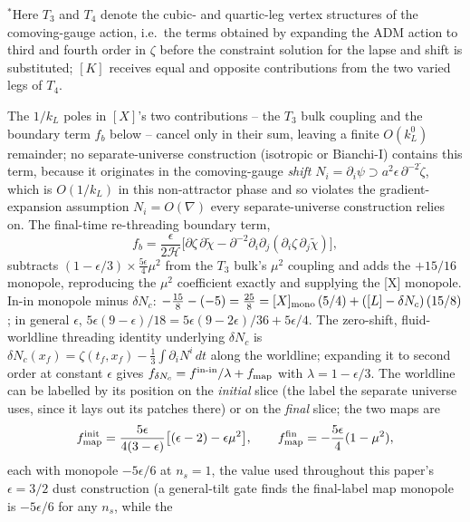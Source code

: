 \documentclass[aps,prd,twocolumn,superscriptaddress,nofootinbib,longbibliography]{revtex4-2}
\begin{document}
\noindent$^{\ast}$Here $T_3$ and $T_4$ denote the cubic- and quartic-leg
vertex structures of the comoving-gauge action, i.e.\ the terms obtained by
expanding the ADM action to third and fourth order in $\zeta$ before the
constraint solution for the lapse and shift is substituted; $[K]$ receives
equal and opposite contributions from the two varied legs of $T_4$.

The $1/k_L$ poles in $[X]$'s two contributions -- the $T_3$ bulk coupling
and the boundary term $f_b$ below -- cancel only in their sum, leaving a
finite $O(k_L^0)$ remainder; no separate-universe construction (isotropic or
Bianchi-I) contains this term, because it originates in the comoving-gauge
\emph{shift} $N_i=\partial_i\psi\supset a^2\epsilon\,\partial^{-2}\dot\zeta$,
which is $O(1/k_L)$ in this non-attractor phase and so violates the
gradient-expansion assumption $N_i=O(\nabla)$ every separate-universe
construction relies on. The final-time re-threading boundary term,
\begin{equation}
f_b=\frac{\epsilon}{2\mathcal H}\Big[\partial\zeta\,\partial\tilde\chi
-\partial^{-2}\partial_i\partial_j(\partial_i\zeta\,\partial_j\tilde\chi)\Big],
\end{equation}
subtracts $(1-\epsilon/3)\times\tfrac{5\epsilon}{4}\mu^2$ from the $T_3$
bulk's $\mu^2$ coupling and adds the $+15/16$ monopole, reproducing the
$\mu^2$ coefficient exactly and supplying the [X] monopole. In-in monopole minus
$\delta N_c$: $-\tfrac{15}{8}-(-5)=\tfrac{25}{8}=[X]_{\rm mono}\,(5/4)+
([L]-\delta N_c)\,(15/8)$; in general $\epsilon$,
$5\epsilon(9-\epsilon)/18=5\epsilon(9-2\epsilon)/36+5\epsilon/4$. The
zero-shift, fluid-worldline threading identity underlying $\delta N_c$ is
$\delta N_c(x_f)=\zeta(t_f,x_f)-\tfrac13\int\partial_iN^i\,dt$ along the
worldline; expanding it to second order at constant $\epsilon$ gives
$f_{\delta N_c}=f^{\rm in\text{-}in}/\lambda+f_{\rm map}$ with
$\lambda=1-\epsilon/3$. The worldline can be labelled by its position on
the \emph{initial} slice (the label the separate universe uses, since it
lays out its patches there) or on the \emph{final} slice; the two maps
are
\begin{equation}
f_{\rm map}^{\rm init}=\frac{5\epsilon}{4(3-\epsilon)}\big[(\epsilon-2)-\epsilon\mu^2\big],\qquad
f_{\rm map}^{\rm fin}=-\frac{5\epsilon}{4}(1-\mu^2),
\end{equation}
each with monopole $-5\epsilon/6$ at $n_s=1$, the value used throughout
this paper's $\epsilon=3/2$ dust construction (a general-tilt gate finds
the final-label map monopole is $-5\epsilon/6$ for any $n_s$, while the
\end{document}
